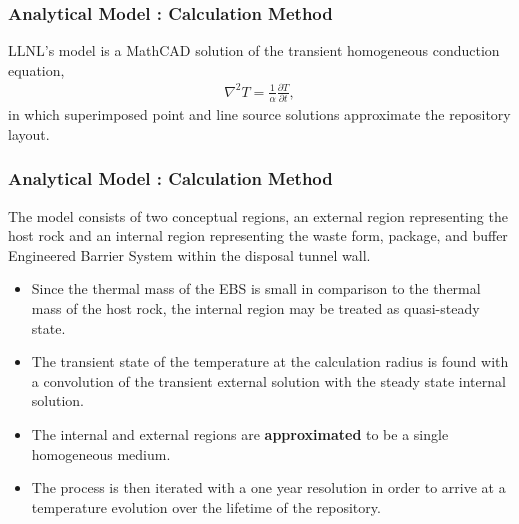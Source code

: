 \begin{frame}
  \frametitle{Analytical Model : Calculation Method}
    LLNL's model is a MathCAD solution of the transient homogeneous 
    conduction equation,
    \begin{align}
      \nabla^2T  = \frac{1}{\alpha}\frac{\partial T}{\partial t},
      \label{condGl}
    \end{align}
    in which superimposed point and line source solutions approximate the repository 
    layout.
\end{frame}

\begin{frame}[ctb!]
\frametitle{Analytical Model : Calculation Method}
The model consists of two conceptual regions, an external region representing 
the host rock and an internal region representing the waste form, package, and 
buffer Engineered Barrier System within the disposal tunnel wall.   
\begin{itemize}
  \item Since the thermal mass of the EBS is small in comparison to the thermal 
    mass of the host rock, the internal region may be treated as quasi-steady 
    state.
  \item The transient state of the temperature at the calculation radius is 
    found with a convolution of the transient external solution with the steady 
    state internal solution.
  \item The internal and external regions are \textbf{approximated} to be a 
    single homogeneous medium.
  \item The process is then iterated with a one year resolution in order to 
    arrive at a temperature evolution over the lifetime of the repository. 
\end{itemize}
\end{frame}


